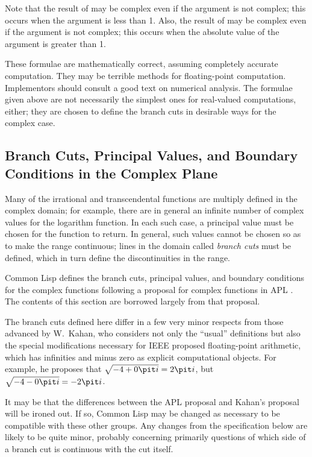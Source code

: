 \begin{defun}[Function]
Note that the result of  may be
complex even if the argument is not complex; this occurs
when the argument is less than 1.
Also, the result of  may be
complex even if the argument is not complex; this occurs
when the absolute value of the argument is greater than 1.

\beforenoterule
\begin{implementation}
These formulae are mathematically correct, assuming
completely accurate computation.  They may be terrible methods for
floating-point computation.  Implementors should consult a good text on
numerical analysis.  The formulae given above are not necessarily
the simplest ones for real-valued computations, either; they are chosen
to define the branch cuts in desirable ways for the complex case.
\end{implementation}
\afternoterule
\end{defun}

\subsection{Branch Cuts, Principal Values, and Boundary Conditions in the Complex Plane}
\label{BRANCH-CUTS-SECTION}



Many of the irrational and transcendental functions are multiply defined
in the complex domain; for example, there are in general an infinite
number of complex values for the logarithm function.  In each such
case, a principal value must be chosen for the function to return.
In general, such values cannot be chosen so as to make the range
continuous; lines in the domain
called {\it branch cuts} must be defined, which in turn
define the discontinuities in the range.

Common Lisp defines the branch cuts, principal values, and boundary
conditions for the complex functions following
a proposal for complex functions in APL \cite{APL-BRANCH-CUTS}.
The contents of this section are borrowed largely from that proposal.

\beforenoterule
\begin{incompatibility}
The branch cuts defined here differ in a few very minor
respects from those advanced by W.~Kahan, who considers not only the
``usual'' definitions but also the special modifications necessary for
{IEEE} proposed floating-point arithmetic, which has infinities and
minus zero as explicit computational objects.  For example, he proposes
that $\sqrt{-4+0{\it i}}=2{\it i}$, but $\sqrt{-4-0{\it i}}=-2{\it i}$.

It may be that the differences between the APL proposal and Kahan's
proposal will be ironed out.  If so, Common Lisp may be
changed as necessary to be compatible with these other groups.  Any changes
from the specification below are likely to be quite minor,
probably concerning primarily questions of which side of a branch cut
is continuous with the cut itself.
\end{incompatibility}
\afternoterule

